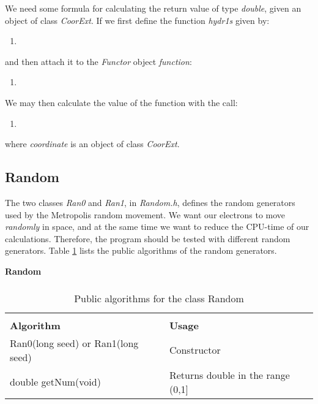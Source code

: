 We need some formula for calculating the return value of type
\emph{double}, given an object of class \emph{CoorExt}. If we first
define the function \emph{hydr1s} given by:

{\footnotesize
\begin{enumerate}
\item[]
  
\end{enumerate}
}

and then attach it to the \emph{Functor} object \emph{function}:

{\footnotesize
\begin{enumerate}
\item[]
  
\end{enumerate}
}

We may then calculate the value of the function with the call:

{\footnotesize
\begin{enumerate}
\item[]
  
\end{enumerate}
}

where \emph{coordinate} is an object of class \emph{CoorExt}. 



\subsection{Random}

The two classes \emph{Ran0} and \emph{Ran1}, in
\emph{Random.h}, defines the random generators used by the
Metropolis random movement. We want our electrons to move \emph{randomly}
in space, and at the same time we want to reduce the CPU-time of our
calculations. Therefore, the program should be tested with different
random generators. Table \ref{Random} lists the
public algorithms of the random generators.

\begin{table}[hbtp]
\begin{center} {\large \bf Random} \\ 
$\phantom{a}$ \\
\begin{tabular}{ll}
\hline\\ 
{\bf Algorithm}                   & {\bf Usage} \\
Ran0(long seed) or Ran1(long seed)& Constructor\\
double getNum(void)               & Returns double in the range (0,1]\\
\hline
\end{tabular} 
 \end{center}
  \caption{Public algorithms for the class Random}
\label{Random}
\end{table}

